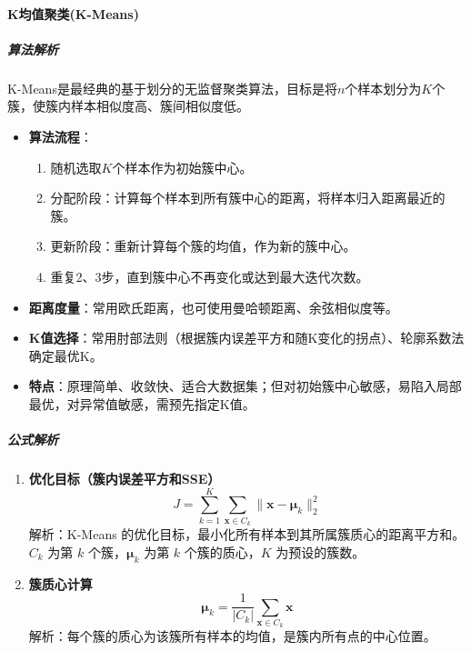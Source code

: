 \documentclass[12pt]{article}
\begin{document}
\paragraph{K均值聚类(K-Means)}
\subparagraph{算法解析}
K-Means是最经典的基于划分的无监督聚类算法，目标是将$n$个样本划分为$K$个簇，使簇内样本相似度高、簇间相似度低。
\begin{itemize}
    \item \textbf{算法流程}：
    \begin{enumerate}
        \item 随机选取$K$个样本作为初始簇中心。
        \item 分配阶段：计算每个样本到所有簇中心的距离，将样本归入距离最近的簇。
        \item 更新阶段：重新计算每个簇的均值，作为新的簇中心。
        \item 重复2、3步，直到簇中心不再变化或达到最大迭代次数。
    \end{enumerate}
    \item \textbf{距离度量}：常用欧氏距离，也可使用曼哈顿距离、余弦相似度等。
    \item \textbf{K值选择}：常用肘部法则（根据簇内误差平方和随K变化的拐点）、轮廓系数法确定最优K。
    \item \textbf{特点}：原理简单、收敛快、适合大数据集；但对初始簇中心敏感，易陷入局部最优，对异常值敏感，需预先指定K值。
\end{itemize}

\subparagraph{公式解析}
\begin{enumerate}
    \item \textbf{优化目标（簇内误差平方和SSE）}
    \[
    J = \sum_{k=1}^K \sum_{\boldsymbol{x} \in C_k} \| \boldsymbol{x} - \boldsymbol{\mu}_k \|_2^2
    \]
    解析：K-Means 的优化目标，最小化所有样本到其所属簇质心的距离平方和。$C_k$ 为第 $k$ 个簇，$\boldsymbol{\mu}_k$ 为第 $k$ 个簇的质心，$K$ 为预设的簇数。

    \item \textbf{簇质心计算}
    \[
    \boldsymbol{\mu}_k = \frac{1}{|C_k|} \sum_{\boldsymbol{x} \in C_k} \boldsymbol{x}
    \]
    解析：每个簇的质心为该簇所有样本的均值，是簇内所有点的中心位置。
\end{enumerate}
\end{document}
